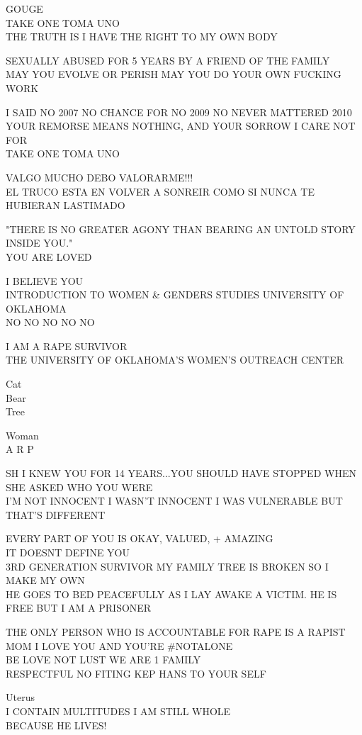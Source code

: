 \documentclass[10pt,letterpaper]{article}
\begin{document}
GOUGE\\
TAKE ONE TOMA UNO\\
THE TRUTH IS I HAVE THE RIGHT TO MY OWN BODY

SEXUALLY ABUSED FOR 5 YEARS BY A FRIEND OF THE FAMILY\\
MAY YOU EVOLVE OR PERISH MAY YOU DO YOUR OWN FUCKING WORK

I SAID NO 2007 NO CHANCE FOR NO 2009 NO NEVER MATTERED 2010\\
YOUR REMORSE MEANS NOTHING, AND YOUR SORROW I CARE NOT FOR\\
TAKE ONE TOMA UNO

VALGO MUCHO DEBO VALORARME!!!\\
EL TRUCO ESTA EN VOLVER A SONREIR COMO SI NUNCA TE HUBIERAN LASTIMADO

"THERE IS NO GREATER AGONY THAN BEARING AN UNTOLD STORY INSIDE YOU."\\
YOU ARE LOVED

I BELIEVE YOU\\
INTRODUCTION TO WOMEN \& GENDERS STUDIES UNIVERSITY OF OKLAHOMA\\
NO NO NO NO NO

I AM A RAPE SURVIVOR\\
THE UNIVERSITY OF OKLAHOMA'S WOMEN'S OUTREACH CENTER

Cat\\
Bear\\
Tree

Woman\\
A R P

SH I KNEW YOU FOR 14 YEARS...YOU SHOULD HAVE STOPPED WHEN SHE ASKED WHO YOU WERE\\
I'M NOT INNOCENT I WASN'T INNOCENT I WAS VULNERABLE BUT THAT'S DIFFERENT

EVERY PART OF YOU IS OKAY, VALUED, + AMAZING\\
IT DOESNT DEFINE YOU\\
3RD GENERATION SURVIVOR MY FAMILY TREE IS BROKEN SO I MAKE MY OWN\\
HE GOES TO BED PEACEFULLY AS I LAY AWAKE A VICTIM.  HE IS FREE BUT I AM A PRISONER

THE ONLY PERSON WHO IS ACCOUNTABLE FOR RAPE IS A RAPIST MOM I LOVE YOU AND YOU'RE \#NOTALONE\\
BE LOVE NOT LUST WE ARE 1 FAMILY\\
RESPECTFUL NO FITING KEP HANS TO YOUR SELF

Uterus\\
I CONTAIN MULTITUDES I AM STILL WHOLE\\
BECAUSE HE LIVES!
\end{document}
